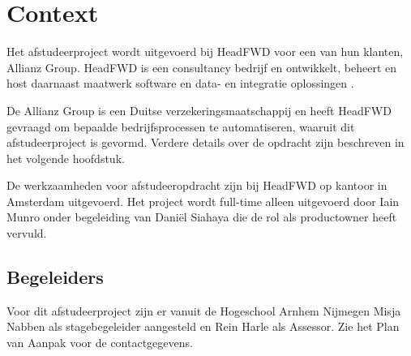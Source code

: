 \chapter{Context}
Het afstudeerproject wordt uitgevoerd bij HeadFWD voor een van hun klanten, Allianz Group. HeadFWD is een consultancy bedrijf en ontwikkelt, beheert en host daarnaast maatwerk software en data- en integratie oplossingen \cite{pva}. 
\par
De Allianz Group is een Duitse verzekeringsmaatschappij\cite{pva} en heeft HeadFWD gevraagd om bepaalde bedrijfsprocessen te automatiseren, waaruit dit afstudeerproject is gevormd. Verdere details over de opdracht zijn beschreven in het volgende hoofdstuk. 
\par
De werkzaamheden voor afstudeeropdracht zijn bij HeadFWD op kantoor in Amsterdam uitgevoerd. Het project wordt full-time alleen uitgevoerd door Iain Munro onder begeleiding van Daniël Siahaya die de rol als productowner heeft vervuld.

\section{Begeleiders}
Voor dit afstudeerproject zijn er vanuit de Hogeschool Arnhem Nijmegen Misja Nabben als stagebegeleider aangesteld en Rein Harle als Assessor. Zie het Plan van Aanpak\cite{pva} voor de contactgegevens.